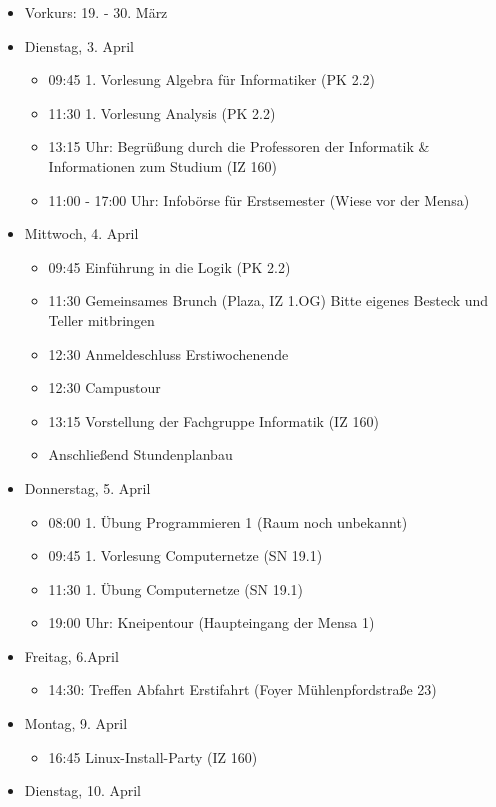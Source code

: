 \begin{itemize}
	\item Vorkurs: 19. - 30. März
	\item Dienstag, 3. April
	\begin{itemize}
		\item 09:45 1. Vorlesung Algebra für Informatiker (PK 2.2)
		\item 11:30 1. Vorlesung Analysis (PK 2.2)
		\item 13:15 Uhr: Begrüßung durch die Professoren der Informatik \& Informationen zum Studium (IZ 160)
		\item 11:00 - 17:00 Uhr: Infobörse für Erstsemester (Wiese vor der Mensa)
	\end{itemize}
	\item Mittwoch, 4. April
	\begin{itemize}
		\item 09:45 Einführung in die Logik (PK 2.2)
		\item 11:30 Gemeinsames Brunch (Plaza, IZ 1.OG) Bitte eigenes Besteck und Teller mitbringen
		\item 12:30 Anmeldeschluss Erstiwochenende
		\item 12:30 Campustour
		\item 13:15 Vorstellung der Fachgruppe Informatik (IZ 160)
		\item Anschließend Stundenplanbau
	\end{itemize}
	\item Donnerstag, 5. April
	\begin{itemize}
		\item 08:00 1. Übung Programmieren 1 (Raum noch unbekannt)
		\item 09:45 1. Vorlesung Computernetze (SN 19.1)
		\item 11:30 1. Übung Computernetze (SN 19.1)
		\item 19:00 Uhr: Kneipentour (Haupteingang der Mensa 1)
	\end{itemize}
	\item Freitag, 6.April
	\begin{itemize}
		\item 14:30: Treffen Abfahrt Erstifahrt (Foyer Mühlenpfordstraße 23)
	\end{itemize}
	\item Montag, 9. April
	\begin{itemize}
		\item 16:45 Linux-Install-Party (IZ 160)
	\end{itemize}
	\item Dienstag, 10. April

\end{itemize}
